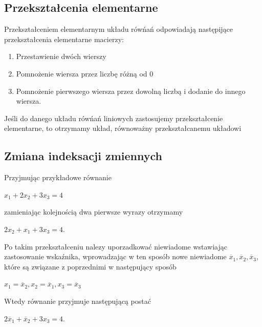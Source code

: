 \documentclass{article}
\begin{document}
\subsection{Przekształcenia elementarne}\label{Przekształcenia elementarne}

Przekształceniem elementarnym układu rówńań odpowiadają następijące przekształcenia elementarne macierzy:
\begin{enumerate}
    \item Przestawienie dwóch wierszy
    \item Pomnożenie wiersza przez liczbę różną od 0
    \item Pomnożenie pierwszego wiersza przez dowolną liczbą i dodanie do innego wiersza.
\end{enumerate}
Jeśli do danego układu rówńań liniowych zastosujemy przekształcenie elementarne, to otrzymamy układ, równoważny przekształcanemu układowi
\subsection{Zmiana indeksacji zmiennych}
Przyjmując przykładowe równanie 
\begin{center}
    \begin{math}
x_{1}+2x_{2}+3x_{3} = 4
\end{math}
\end{center}
 zamieniając kolejnością dwa pierwsze wyrazy otrzymamy 
\begin{center}
    \begin{math}
2x_{2}+x_{1}+3x_{3} = 4
\end{math}.
\end{center}
Po takim przekształceniu nalezy uporzadkować niewiadome wstawiając zastosowanie wskaźnika, wprowadzając w ten sposób nowe niewiadome \begin{math}\overline{x}_{1}, \overline{x}_{2}, \overline{x}_{3}\end{math}, które są związane z poprzednimi w następujący sposób
\begin{center}
    \begin{math}
    x_{1} = \overline{x}_{2}, x_{2} =\overline{x}_{1}, x_{3} =\overline{x}_{3}
    \end{math}
\end{center}
Wtedy równanie przyjmuje następującą postać 
\begin{center}
    \begin{math}
2\overline{x}_{1}+\overline{x}_{2}+3x_{3} = 4
\end{math}.
\end{center}
\end{document}
